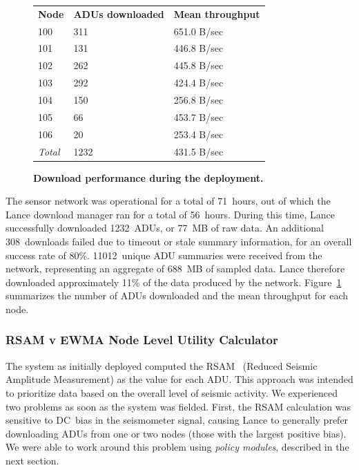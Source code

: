 \begin{figure}[t!]
\caption{{\bf Download performance during the deployment.}}
\vspace{0.2in}
\begin{center}
\begin{tabular}{lll}
\noalign{\smallskip}
{\bf Node}	& {\bf ADUs downloaded} & {\bf Mean throughput} \\
\noalign{\smallskip}\svhline\noalign{\smallskip}
100 & 311 & 651.0 B/sec \\
101 & 131 & 446.8 B/sec \\
102 & 262 & 445.8 B/sec \\
103 & 292 & 424.4 B/sec \\
104 & 150 & 256.8 B/sec \\
105 & 66 & 453.7 B/sec \\
106 & 20 & 253.4 B/sec \\
\noalign{\smallskip}\svhline\noalign{\smallskip}
{\em Total} & 1232 & 431.5 B/sec \\
\end{tabular}
\end{center}
\label{fig-throughputtable}
\end{figure}

The sensor network was operational for a total of 71~hours, out of which the
Lance download manager ran for a total of 56~hours.  During this time, Lance
successfully downloaded 1232~ADUs, or 77~MB of raw data. An additional
308~downloads failed due to timeout or stale summary information, for an
overall success rate of 80\%.  11012~unique ADU summaries were received from
the network, representing an aggregate of 688~MB of sampled data. Lance
therefore downloaded approximately 11\% of the data produced by the network.
Figure~\ref{fig-throughputtable} summarizes the number of ADUs downloaded
and the mean throughput for each node. 

\subsubsection{RSAM v EWMA Node Level Utility Calculator}
\label{subsubsec-rsamvewma}

The system as initially deployed computed the RSAM~\cite{rsam} (Reduced
Seismic Amplitude Measurement) as the value for each ADU.  This approach was
intended to prioritize data based on the overall level of seismic activity.
We experienced two problems as soon as the system was fielded. First, the
RSAM calculation was sensitive to DC~bias in the seismometer signal, causing
Lance to generally prefer downloading ADUs from one or two nodes (those with
the largest positive bias). We were able to work around this problem using
\textit{policy modules}, described in the next section.

